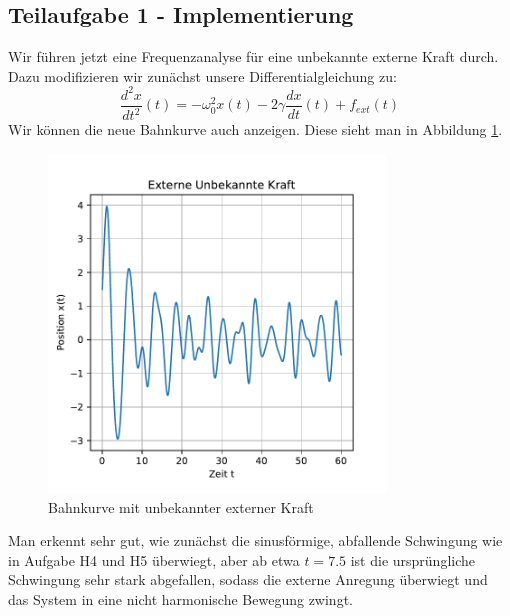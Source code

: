 \documentclass[12pt,a4paper]{article}
\begin{document}
\subsection{Teilaufgabe 1 - Implementierung}
Wir führen jetzt eine Frequenzanalyse für eine unbekannte externe Kraft durch. Dazu modifizieren wir zunächst unsere Differentialgleichung zu:
\begin{equation}
	\frac{d^2x}{dt^2}(t) = -\omega_0^2x(t) - 2\gamma\frac{dx}{dt}(t) + f_{ext}(t)
\end{equation}
Wir können die neue Bahnkurve auch anzeigen. Diese sieht man in Abbildung \ref{f:Kraft_unknown}.
\begin{figure}
	\includegraphics[width=0.8\textwidth]{unbekannteKraft.pdf}
	\caption{Bahnkurve mit unbekannter externer Kraft}\label{f:Kraft_unknown}
\end{figure}
Man erkennt sehr gut, wie zunächst die sinusförmige, abfallende Schwingung wie in Aufgabe H4 und H5 überwiegt, aber ab etwa $t=7.5$ ist die ursprüngliche Schwingung sehr stark abgefallen, sodass die externe Anregung überwiegt und das System in eine nicht harmonische Bewegung zwingt.
\end{document}
